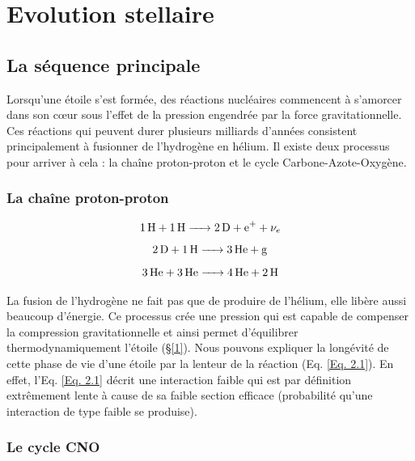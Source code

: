 

	
\chapter{Evolution stellaire}\label{2}

\section{La séquence principale}\label{2.1}

Lorsqu’une étoile s’est formée, des réactions nucléaires commencent à s’amorcer dans son cœur sous l’effet de la pression engendrée par la force gravitationnelle. Ces réactions qui peuvent durer plusieurs milliards d’années consistent principalement à fusionner de l’hydrogène en hélium. Il existe deux processus pour arriver à cela : la chaîne proton-proton et le cycle Carbone-Azote-Oxygène.

\subsection{La chaîne proton-proton}\label{2.1.1}


\begin{equation}\ce{\ce{1H} + \ce{1H} -> \ce{2D} + \ce{e+} + $\nu_{e}$}\label{Eq. 2.1}\end{equation}
\begin{equation}\ce{\ce{2D} + \ce{1H} -> \ce{3He} + g}\label{Eq. 2.2}\end{equation}
\begin{equation}\ce{\ce{3He} + \ce{3He} -> \ce{4He} + \ce{2H}}\label{Eq. 2.3}\end{equation}\smallskip	


La fusion de l’hydrogène ne fait pas que de produire de l’hélium, elle libère aussi beaucoup d’énergie. Ce processus crée une pression qui est capable de compenser la compression gravitationnelle et ainsi permet d’équilibrer thermodynamiquement l’étoile (§\ref{1}).
Nous pouvons expliquer la longévité de cette phase de vie d’une étoile par la lenteur de la réaction (Eq. \ref{Eq. 2.1}). En effet, l’Eq. \ref{Eq. 2.1} décrit une interaction faible qui est par définition extrêmement lente à cause de sa faible section efficace (probabilité qu’une interaction de type faible se produise).

\subsection{Le cycle CNO}\label{2.1.2}


